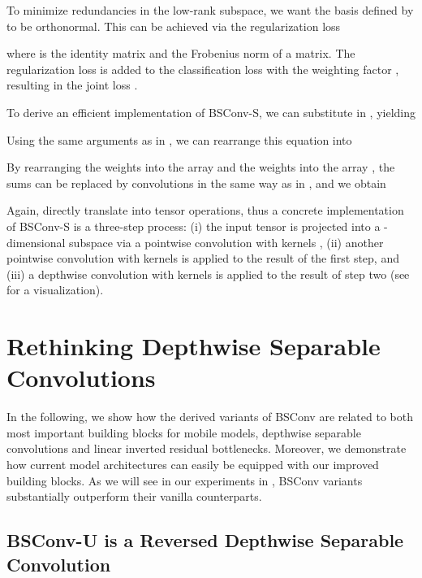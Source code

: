 \documentclass[10pt,twocolumn,letterpaper]{article}
\newcommand{\DCCK}{BSConv\xspace}
\newcommand{\DCCKU}{\DCCK-U\xspace}
\newcommand{\DCCKS}{\DCCK-S\xspace}
\begin{document}
To minimize redundancies in the low-rank subspace, we want the basis defined by  to be orthonormal.
This can be achieved via the regularization loss

where  is the identity matrix and  the Frobenius norm of a matrix.
The regularization loss is added to the classification loss  with the weighting factor , resulting in the joint loss .

To derive an efficient implementation of \DCCKS, we can substitute  in , yielding

Using the same arguments as in , we can rearrange this equation into

By rearranging the weights  into the  array  and the weights  into the  array , the sums can be replaced by convolutions in the same way as in , and we obtain

Again,  directly translate into tensor operations, thus a concrete implementation of \DCCKS is a three-step process:
(i) the input tensor is projected into a -dimensional subspace via a  pointwise convolution with kernels ,
(ii) another  pointwise convolution with kernels  is applied to the result of the first step, and
(iii) a  depthwise convolution with kernels  is applied to the result of step two (see  for a visualization).





\section{Rethinking Depthwise Separable Convolutions}
\label{sec:dcck:mobilenets}
In the following, we show how the derived variants of \DCCK are related to both most important building blocks for mobile models, \ie depthwise separable convolutions and linear inverted residual bottlenecks.
Moreover, we demonstrate how current model architectures can easily be equipped with our improved building blocks.
As we will see in our experiments in , \DCCK variants substantially outperform their vanilla counterparts.

\subsection{\DCCKU is a Reversed Depthwise Separable Convolution}
\label{sec:dcck:mobilenets:dcck-u}
\end{document}
